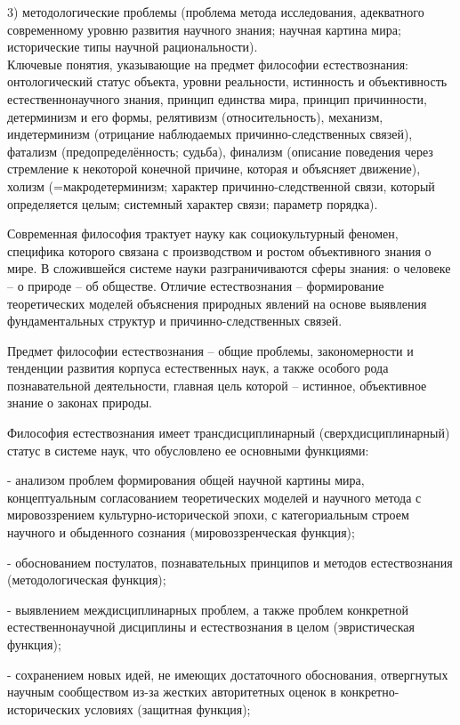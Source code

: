 \documentclass[exam_answers.tex]{subfiles}
\begin{document}
3) методологические проблемы (проблема метода исследования, адекватного современному уровню развития научного знания; научная картина мира; исторические типы научной рациональности).
\\

Ключевые понятия, указывающие на предмет философии естествознания:
онтологический статус объекта,
уровни реальности,
истинность и объективность естественнонаучного знания,
принцип единства мира,
принцип причинности,
детерминизм и его формы,
релятивизм (относительность), механизм, индетерминизм (отрицание наблюдаемых причинно-следственных связей), фатализм (предопределённость; судьба), финализм (описание поведения через стремление к некоторой конечной причине, которая и объясняет движение), холизм (=макродетерминизм; характер причинно-следственной связи, который определяется целым; системный характер связи; параметр порядка).


Современная философия трактует науку как социокультурный феномен,
специфика которого связана с производством и ростом объективного знания о
мире. В сложившейся системе науки разграничиваются сферы знания: о
человеке – о природе – об обществе. Отличие естествознания – формирование
теоретических моделей объяснения природных явлений на основе выявления
фундаментальных структур и причинно-следственных связей.

Предмет философии естествознания – общие проблемы, закономерности
и тенденции развития корпуса естественных наук, а также особого рода
познавательной деятельности, главная цель которой – истинное, объективное
знание о законах природы.

Философия естествознания имеет трансдисциплинарный
(сверхдисциплинарный) статус в системе наук, что обусловлено ее основными
функциями:

- анализом проблем формирования общей научной картины мира,
концептуальным согласованием теоретических моделей и научного метода с
мировоззрением культурно-исторической эпохи, с категориальным строем
научного и обыденного сознания (мировоззренческая функция);

- обоснованием постулатов, познавательных принципов и методов
естествознания (методологическая функция);

- выявлением междисциплинарных проблем, а также проблем конкретной
естественнонаучной дисциплины и естествознания в целом (эвристическая
функция);

- сохранением новых идей, не имеющих достаточного обоснования,
отвергнутых научным сообществом из-за жестких авторитетных оценок в
конкретно-исторических условиях (защитная функция);
\end{document}
